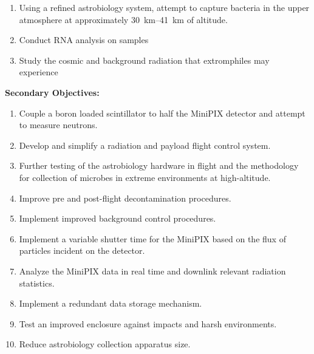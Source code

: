 


	\begin{enumerate}
	\item Using a refined astrobiology system, attempt to capture bacteria in the upper atmosphere at approximately \SIrange{30}{41}{\kilo\meter} of altitude.
%	
%
	\item Conduct RNA analysis on samples
	\item Study the cosmic and background radiation that extromphiles may experience
	\end{enumerate}
%
{\bf Secondary Objectives:}
\begin{enumerate}
\item Couple a boron loaded scintillator to half the MiniPIX detector and attempt to measure neutrons.
\item Develop and simplify a radiation and payload flight control system.
\item Further testing of the astrobiology hardware in flight and the methodology for collection of microbes in extreme environments at high-altitude. 
\item Improve pre and post-flight decontamination procedures.
\item Implement improved background control procedures. 
\item Implement a variable shutter time for the MiniPIX based on the flux of particles incident on the detector.
\item Analyze the MiniPIX data in real time and downlink relevant radiation statistics.
\item Implement a redundant data storage mechanism.
\item Test an improved enclosure against impacts and harsh environments.
\item Reduce astrobiology collection apparatus size.

\end{enumerate}
